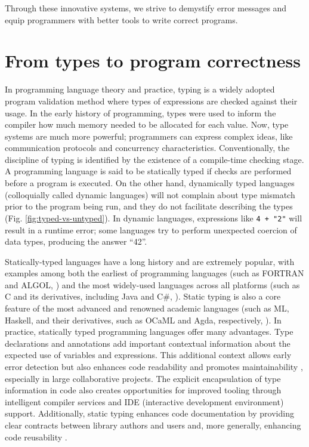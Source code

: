 Through these innovative systems, we strive to demystify error messages and equip programmers with better tools to write correct programs. 

\section{From types to program correctness}

In programming language theory and practice, typing is a widely adopted program validation method where types of expressions are checked against their usage. In the early history of programming, types were used to inform the compiler how much memory needed to be allocated for each value. Now, type systems are much more powerful; programmers can express complex ideas, like communication protocols and concurrency characteristics. Conventionally, the discipline of typing is identified by the existence of a compile-time checking stage. A programming language is said to be statically typed if checks are performed before a program is executed.  On the other hand, dynamically typed languages (colloquially called dynamic languages) will not complain about type mismatch prior to the program being run, and they do not facilitate describing the types (Fig. \ref{fig:typed-vs-untyped}). In dynamic languages, expressions like \texttt{4 + "2"} will result in a runtime error; some languages try to perform unexpected coercion of data types, producing the answer ``42''. 

Statically-typed languages have a long history and are extremely popular, with examples among both the earliest of programming languages (such as FORTRAN and ALGOL, \cite{Backus1978-xt}) and the most widely-used languages across all platforms  (such as C and its derivatives, including Java and C\#, \cite{Ritchie1978-pa}). Static typing is also a core feature of the most advanced and renowned academic languages (such as ML, Haskell, and their derivatives, such as OCaML and Agda, respectively, \cite{Hudak2007-kn}). In practice, statically typed programming languages offer many advantages. Type declarations and annotations add important contextual information about the expected use of variables and expressions. This additional context allows early error detection but also enhances code readability and promotes maintainability \cite{Kleinschmager2012-bg}, especially in large collaborative projects. The explicit encapsulation of type information in code also creates opportunities for improved tooling through intelligent compiler services and IDE (interactive development environment) support. Additionally, static typing enhances code documentation by providing clear contracts between library authors and users and, more generally, enhancing code reusability \cite{Endrikat2014-uz}.


